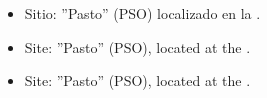 \begin{itemize}
  \ifes
    \item Sitio: ''Pasto'' (PSO) localizado en la \institution. 
  \fi
  \ifen
    \item Site: ''Pasto'' (PSO), located at the \institution. 
  \fi
  \ifpt
    \item Site: ''Pasto'' (PSO), located at the \institution. 
  \fi
\end{itemize}
